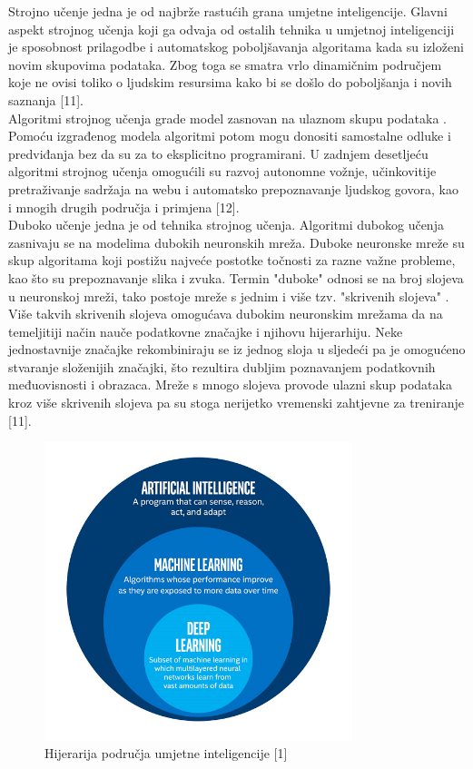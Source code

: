 \documentclass[times, utf8, zavrsni]{fer}
\begin{document}
\indent{}
Strojno učenje jedna je od najbrže rastućih grana umjetne inteligencije. Glavni aspekt strojnog učenja koji ga odvaja od ostalih tehnika u umjetnoj inteligenciji je sposobnost prilagodbe i automatskog poboljšavanja algoritama kada su izloženi novim skupovima podataka. Zbog toga se smatra vrlo dinamičnim područjem koje ne ovisi toliko o ljudskim resursima kako bi se došlo do poboljšanja i novih saznanja [11].\\
%
\indent{}
Algoritmi strojnog učenja grade model zasnovan na ulaznom skupu podataka . Pomoću izgrađenog modela algoritmi potom mogu donositi samostalne odluke i predviđanja bez da su za to eksplicitno programirani. U zadnjem desetljeću algoritmi strojnog učenja omogućili su razvoj autonomne vožnje, učinkovitije pretraživanje sadržaja na webu i automatsko prepoznavanje ljudskog govora, kao i mnogih drugih područja i primjena [12].\\
%
\indent{}
Duboko učenje jedna je od tehnika strojnog učenja. Algoritmi dubokog učenja zasnivaju se na modelima dubokih neuronskih mreža. Duboke neuronske mreže su skup algoritama koji postižu najveće postotke točnosti za razne važne probleme, kao što su prepoznavanje slika i zvuka. Termin "duboke" odnosi se na broj slojeva u neuronskoj mreži, tako postoje mreže s jednim i više tzv. "skrivenih slojeva" . Više takvih skrivenih slojeva omogućava dubokim neuronskim mrežama da na temeljitiji način nauče podatkovne značajke i njihovu hijerarhiju. Neke jednostavnije značajke rekombiniraju se iz jednog sloja u sljedeći pa je omogućeno stvaranje složenijih značajki, što rezultira dubljim poznavanjem podatkovnih međuovisnosti i obrazaca. Mreže s mnogo slojeva provode ulazni skup podataka kroz više skrivenih slojeva pa su stoga nerijetko vremenski zahtjevne za treniranje [11].\\
\newpage
%
\begin{figure}[!h]
\hspace{0.1\textwidth}
\includegraphics[width=0.8\textwidth]{./slike/AI-Circle.png}
\caption{Hijerarija područja umjetne inteligencije [1]}
\label{fig:ai-područja}
\end{figure}
\end{document}
